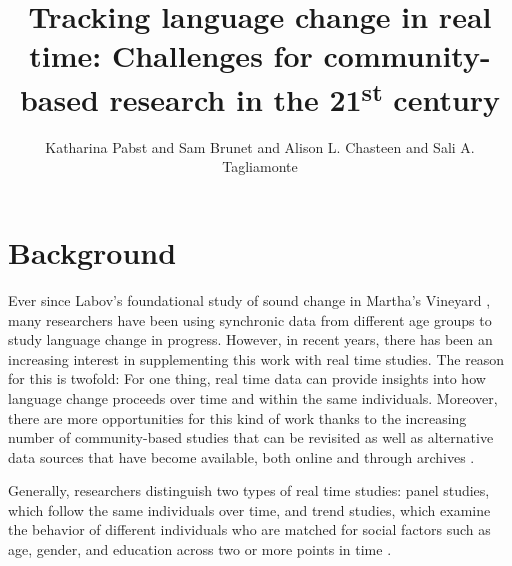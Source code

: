 \documentclass[output=paper]{langscibook}
\author{Katharina Pabst\orcid{}\affiliation{Radboud University; University of Toronto} and Sam Brunet\orcid{}\affiliation{University of Toronto} and Alison L. Chasteen\orcid{}\affiliation{University of Toronto} and Sali A. Tagliamonte\orcid{}\affiliation{University of Toronto}}
\title[Tracking language change in real time]{Tracking language change in real time: Challenges for community-based research in the 21\textsuperscript{st} century}
\begin{document}
\maketitle
\label{chap:pabst}
\graphicspath{{figures/pabst}}

\section{Background}
\label{sec:pabst:1}
Ever since Labov’s foundational study of sound change in Martha’s Vineyard \citep{Labov1963}, many researchers have been using synchronic data from different age groups to study language change in progress. However, in recent years, there has been an increasing interest in supplementing this work with real time studies. The reason for this is twofold: For one thing, real time data can provide insights into how language change proceeds over time and within the same individuals. Moreover, there are more opportunities for this kind of work thanks to the increasing number of community-based studies that can be revisited as well as alternative data sources that have become available, both online and through archives \citep[298]{Sankoff2018}.


Generally, researchers distinguish two types of real time studies: panel studies, which follow the same individuals over time, and trend studies, which examine the behavior of different individuals who are matched for social factors such as age, gender, and education across two or more points in time \citep[1003]{Sankoff2005}.
\end{document}
